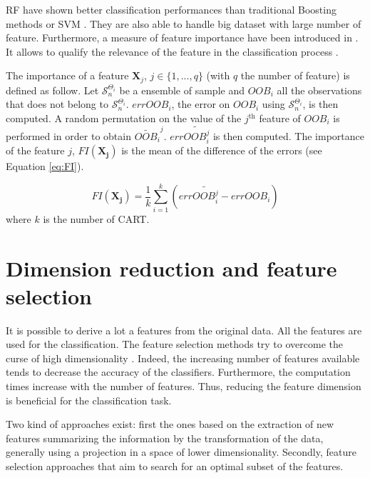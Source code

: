 RF have shown better classification performances than traditional Boosting methods \citep{breiman2001random} or SVM \citep{pal2005random}. They are also able to handle big dataset with large number of feature. Furthermore, a measure of feature importance have been introduced in \cite{breiman2001random}. It allows to qualify the relevance of the feature in the classification process \citep{strobl2007bias}.

The importance of a feature $\mathbf{X}_{j}$, $j\in\{1,...,q\}$ (with $q$ the number of feature) is defined as follow. Let $\mathcal{S}_{n}^{\Theta_{i}}$ be a ensemble of sample and $OOB_{i}$ all the observations that does not belong to $\mathcal{S}_{n}^{\Theta_{i}}$. $errOOB_{i}$, the error on $OOB_{i}$ using $\mathcal{S}_{n}^{\Theta_{i}}$, is then computed. A random permutation on the value of the $j^{\text{th}}$ feature of $OOB_{i}$ is performed in order to obtain $\widetilde{OOB_{i}}^j$. $err\widetilde{OOB_{i}^{j}}$ is then computed. The importance of the feature $j$, $FI(\mathbf{X_{j}})$ is the mean of the difference of the errors (see Equation \ref{eq:FI}).

\begin{equation}
\label{eq:FI}
FI(\mathbf{X_{j}})=\frac{1}{k}\sum_{i=1}^{k}(err\widetilde{OOB_{i}^{j}}-errOOB_{i})
\end{equation}
where $k$ is the number of CART.


\section{Dimension reduction and feature selection}
It is possible to derive a lot a features from the original data. All the features are used for the classification. The feature selection methods try to overcome the curse of high dimensionality \citep{bellman2015adaptive, hughes1968mean}. Indeed, the increasing number of features available tends to decrease the accuracy of the classifiers. Furthermore, the computation times increase with the number of features. Thus, reducing the feature dimension is beneficial for the classification task.

Two kind of approaches exist: first the ones based on the extraction of new features summarizing the information by the transformation of the data, generally using a projection in a space of lower dimensionality. Secondly, feature selection approaches that aim to search for an optimal subset of the features.

